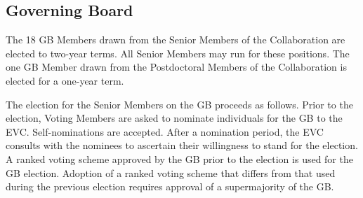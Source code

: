 \documentclass[12pt]{article}
\newcommand{\exec}{{Executive Team}}
\begin{document}


\subsection{Governing Board}
\label{sec:gb-elections}

The 18 GB Members drawn from the Senior Members of the Collaboration are elected to two-year terms.  All Senior Members may  run for these positions. The one GB Member drawn from the Postdoctoral Members of the Collaboration is elected for a one-year term.

The election for the Senior Members on the GB proceeds as follows. 
Prior to the election, Voting Members are asked to nominate individuals for the GB to the EVC.   Self-nominations are accepted. After a nomination period, the EVC consults with the nominees to ascertain their willingness to stand for the election.
\textcolor{\markcolor}{A ranked voting scheme approved by the GB prior to the election is used for the GB election.
Adoption of a ranked voting scheme that differs from that used during the previous election requires approval of a supermajority of the GB. }

\end{document}

